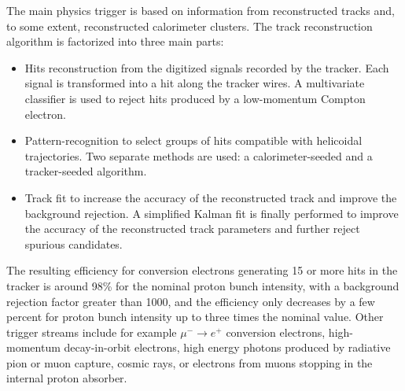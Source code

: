 The main physics trigger is based on information from reconstructed tracks and, to some extent, reconstructed calorimeter clusters. The track reconstruction algorithm is factorized into three main parts:
\begin{itemize}
\item Hits reconstruction from the digitized signals recorded by the tracker. Each signal is transformed into a hit along the tracker wires. A multivariate classifier is used to reject hits produced by a low-momentum Compton electron. 
\item Pattern-recognition to select groups of hits compatible with helicoidal trajectories. Two separate methods are used: a calorimeter-seeded and a tracker-seeded algorithm.
\item Track fit to increase the accuracy of the reconstructed track and improve the background rejection. A simplified Kalman fit is finally performed to improve the accuracy of the reconstructed track parameters and further reject spurious candidates.
\end{itemize}

The resulting efficiency for conversion electrons generating 15 or more hits in the tracker is around 98\% for the nominal proton bunch intensity, with a background rejection factor greater than 1000, and the efficiency only decreases by a few percent for proton bunch intensity up to three times the nominal value. Other trigger streams include for example $\mu^- \rightarrow e^+$ conversion electrons, high-momentum decay-in-orbit electrons, high energy photons produced by radiative pion or muon capture, cosmic rays, or electrons from muons stopping in the internal proton absorber.






